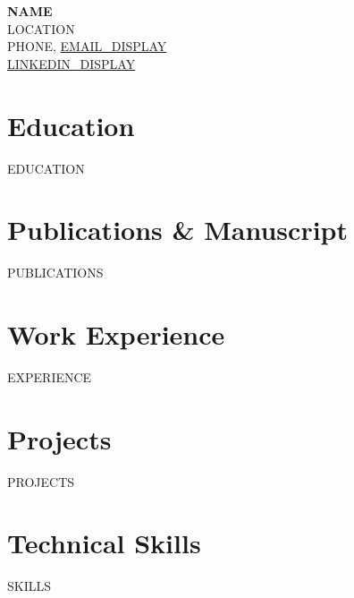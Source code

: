 \documentclass[letterpaper,11pt]{article}
\newcommand{\resumeSubHeadingListStart}{\begin{itemize}[leftmargin=0.0in, label={}]}
\newcommand{\resumeSubHeadingListEnd}{\end{itemize}}
\begin{document}
    \begin{center}
        {\Huge \textbf{{{NAME}}}} \\
        \vspace{2pt}
        {{LOCATION}} \\
        \vspace{1pt}
        {{PHONE}}, \href{mailto:{{EMAIL_URL}}}{{{EMAIL_DISPLAY}}} \\
        \vspace{1pt}
        \href{{{LINKEDIN_URL}}}{{{LINKEDIN_DISPLAY}}}
    \end{center}

\section{Education}
  \resumeSubHeadingListStart
{{EDUCATION}}
  \resumeSubHeadingListEnd

\section{Publications \& Manuscript}
  \resumeSubHeadingListStart
{{PUBLICATIONS}}
  \resumeSubHeadingListEnd

\section{Work Experience}
  \resumeSubHeadingListStart
{{EXPERIENCE}}
  \resumeSubHeadingListEnd

\section{Projects}
\resumeSubHeadingListStart
{{PROJECTS}}
\resumeSubHeadingListEnd

\section{Technical Skills}
\vspace{-7pt}
\begin{itemize}
[leftmargin=0.15in, label={}]\small{\item{
{{SKILLS}}
}}
\end{itemize}
\end{document}
